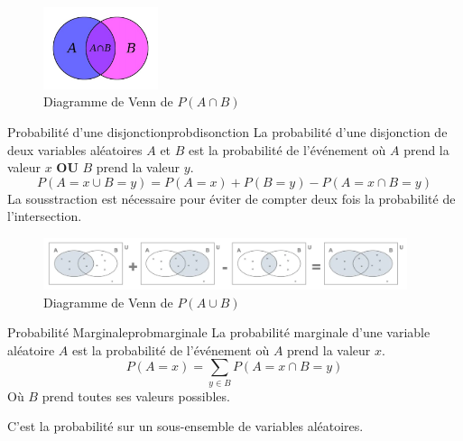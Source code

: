 \begin{figure}[H]
    \begin{center}
        \includegraphics[width=0.3\textwidth]{../pictures/conjproba.jpg}
    \end{center}
    \caption{Diagramme de Venn de $P(A \cap B)$}\label{fig:conjproba}
\end{figure}



\begin{definition}{Probabilité d'une disjonction}{probdisonction}
    La probabilité d'une disjonction de deux variables aléatoires $A$ et $B$ est la probabilité de l'événement 
    où $A$ prend la valeur $x$ \textbf{OU} $B$ prend la valeur $y$.
    \begin{equation}
        P(A=x \cup B=y) = P(A=x) + P(B=y) - P(A=x\cap B=y)
    \end{equation}
    La sousstraction est nécessaire pour éviter de compter deux fois la probabilité de l'intersection.
\end{definition}

\begin{figure}[H]
    \begin{center}
        \includegraphics[width=0.95\textwidth]{../pictures/disjproba.png}
    \end{center}
    \caption{Diagramme de Venn de $P(A \cup B)$}\label{fig:disjproba}
\end{figure}




\begin{definition}{Probabilité Marginale}{probmarginale}
    La probabilité marginale d'une variable aléatoire $A$ est la probabilité de l'événement 
    où $A$ prend la valeur $x$.
    \begin{equation}
        P(A=x) = \sum_{y \in B} P(A=x \cap B=y)
    \end{equation} 
    Où $B$ prend toutes ses valeurs possibles.
    
\end{definition}
\begin{remark}\leavevmode
    C'est la probabilité sur un sous-ensemble de variables aléatoires.
\end{remark}

